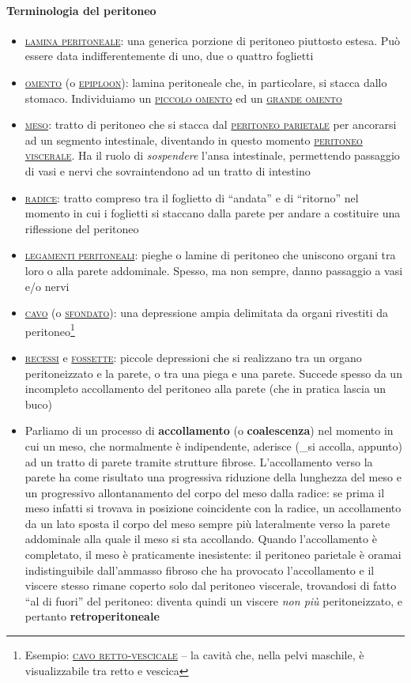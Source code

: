 \documentclass[italian,]{article}
\providecommand{\tightlist}{%
  \setlength{\itemsep}{0pt}\setlength{\parskip}{0pt}}
\renewcommand{\a}[1]{\underline{\textsc{#1}}}
\begin{document}
\hypertarget{terminologia-del-peritoneo}{%
\paragraph{Terminologia del
peritoneo}\label{terminologia-del-peritoneo}}

\begin{itemize}
\tightlist
\item
  \a{lamina peritoneale}: una generica porzione di peritoneo piuttosto
  estesa. Può essere data indifferentemente di uno, due o quattro
  foglietti
\item
  \a{omento} (o \a{epiploon}): lamina peritoneale che, in particolare,
  si stacca dallo stomaco. Individuiamo un \a{piccolo omento} ed un
  \a{grande omento}
\item
  \a{meso}: tratto di peritoneo che si stacca dal
  \a{peritoneo parietale} per ancorarsi ad un segmento intestinale,
  diventando in questo momento \a{peritoneo viscerale}. Ha il ruolo di
  \emph{sospendere} l'ansa intestinale, permettendo passaggio di vasi e
  nervi che sovraintendono ad un tratto di intestino
\item
  \a{radice}: tratto compreso tra il foglietto di ``andata'' e di
  ``ritorno'' nel momento in cui i foglietti si staccano dalla parete
  per andare a costituire una riflessione del peritoneo
\item
  \a{legamenti peritoneali}: pieghe o lamine di peritoneo che uniscono
  organi tra loro o alla parete addominale. Spesso, ma non sempre, danno
  passaggio a vasi e/o nervi
\item
  \a{cavo} (o \a{sfondato}): una depressione ampia delimitata da organi
  rivestiti da peritoneo\footnote{Esempio: \a{cavo retto-vescicale} --
    la cavità che, nella pelvi maschile, è visualizzabile tra retto e
    vescica}
\item
  \a{recessi} e \a{fossette}: piccole depressioni che si realizzano tra
  un organo peritoneizzato e la parete, o tra una piega e una parete.
  Succede spesso da un incompleto accollamento del peritoneo alla parete
  (che in pratica lascia un buco)
\item
  Parliamo di un processo di \textbf{accollamento} (o
  \textbf{coalescenza}) nel momento in cui un meso, che normalmente è
  indipendente, aderisce (\_si accolla, appunto) ad un tratto di parete
  tramite strutture fibrose. L'accollamento verso la parete ha come
  risultato una progressiva riduzione della lunghezza del meso e un
  progressivo allontanamento del corpo del meso dalla radice: se prima
  il meso infatti si trovava in posizione coincidente con la radice, un
  accollamento da un lato sposta il corpo del meso sempre più
  lateralmente verso la parete addominale alla quale il meso si sta
  accollando. Quando l'accollamento è completato, il meso è praticamente
  inesistente: il peritoneo parietale è oramai indistinguibile
  dall'ammasso fibroso che ha provocato l'accollamento e il viscere
  stesso rimane coperto solo dal peritoneo viscerale, trovandosi di
  fatto ``al di fuori'' del peritoneo: diventa quindi un viscere
  \emph{non più} peritoneizzato, e pertanto \textbf{retroperitoneale}
\end{itemize}
\end{document}

